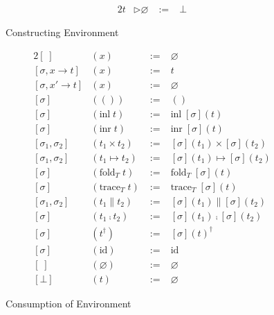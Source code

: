 \documentclass[a4j, dvipdfmx]{jsarticle}
\theoremstyle{definition}
\begin{document}
\begin{figure}[H]
\begin{minipage}[b]{0.48\hsize}
\begin{alignat*}{2}
      t                 &\triangleright \varnothing       \;&:=\; &\bot
    \end{alignat*}
    \caption{Constructing Environment}
    \label{fig:tm_mcth}
  \end{minipage}
  \begin{minipage}[b]{0.48\hsize}
    \begin{alignat*}{2}
      [\;]&(x)                                  \;&:=\; &\varnothing \\
      [\sigma,x\rightarrow t]&(x)               \;&:=\; &t \\
      [\sigma,x'\rightarrow t]&(x)              \;&:=\; &\varnothing \\
      [\sigma]&(())                             \;&:=\; &() \\
      [\sigma]&(\text{inl}\;t)                  \;&:=\; &\text{inl}\;[\sigma](t) \\
      [\sigma]&(\text{inr}\;t)                  \;&:=\; &\text{inr}\;[\sigma](t) \\
      [\sigma_1,\sigma_2]&(t_1\times{}t_2)      \;&:=\; &[\sigma](t_1)\times[\sigma](t_2) \\
      [\sigma_1,\sigma_2]&(t_1\mapsto{}t_2)     \;&:=\; &[\sigma](t_1)\mapsto[\sigma](t_2) \\
      [\sigma]&(\text{fold}_T\;t)    \;&:=\; &\text{fold}_T\;[\sigma](t) \\
      [\sigma]&(\text{trace}_T\;t)   \;&:=\; &\text{trace}_T\;[\sigma](t) \\
      [\sigma_1,\sigma_2]&(t_1\parallel{}t_2)   \;&:=\; &[\sigma](t_1)\parallel[\sigma](t_2) \\
      [\sigma]&(t_1\fcmp{}t_2)       \;&:=\; &[\sigma](t_1)\fcmp[\sigma](t_2) \\
      [\sigma]&(t^\dagger)           \;&:=\; &[\sigma](t)^\dagger \\
      [\sigma]&(\text{id})           \;&:=\; &\text{id} \\
      [\;]&(\varnothing)             \;&:=\; &\varnothing \\
      [\bot]&(t)                     \;&:=\; &\varnothing
    \end{alignat*}
    \caption{Consumption of Environment}
    \label{fig:tm_sbst}
  \end{minipage}
\end{figure}
\end{document}
